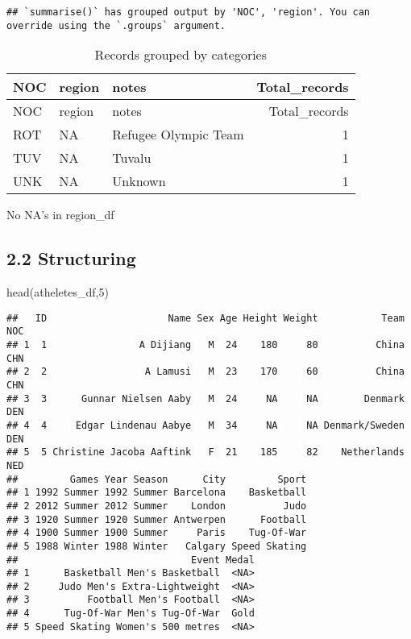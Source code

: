 \documentclass[
]{article}
\newenvironment{Shaded}{\begin{snugshade}}{\end{snugshade}}
\newcommand{\DecValTok}[1]{\textcolor[rgb]{0.00,0.00,0.81}{#1}}
\newcommand{\FunctionTok}[1]{\textcolor[rgb]{0.00,0.00,0.00}{#1}}
\newcommand{\NormalTok}[1]{#1}
\begin{document}
\begin{verbatim}
## `summarise()` has grouped output by 'NOC', 'region'. You can override using the `.groups` argument.
\end{verbatim}

\begin{longtable}[]{@{}lllr@{}}
\caption{Records grouped by categories}\tabularnewline
\toprule
NOC & region & notes & Total\_records \\
\midrule
\endfirsthead
\toprule
NOC & region & notes & Total\_records \\
\midrule
\endhead
ROT & NA & Refugee Olympic Team & 1 \\
TUV & NA & Tuvalu & 1 \\
UNK & NA & Unknown & 1 \\
\bottomrule
\end{longtable}

No NA's in region\_df

\hypertarget{structuring}{%
\subsection{2.2 Structuring}\label{structuring}}

\begin{Shaded}
\begin{Highlighting}[]
\FunctionTok{head}\NormalTok{(atheletes\_df,}\DecValTok{5}\NormalTok{)}
\end{Highlighting}
\end{Shaded}

\begin{verbatim}
##   ID                     Name Sex Age Height Weight           Team NOC
## 1  1                A Dijiang   M  24    180     80          China CHN
## 2  2                 A Lamusi   M  23    170     60          China CHN
## 3  3      Gunnar Nielsen Aaby   M  24     NA     NA        Denmark DEN
## 4  4     Edgar Lindenau Aabye   M  34     NA     NA Denmark/Sweden DEN
## 5  5 Christine Jacoba Aaftink   F  21    185     82    Netherlands NED
##         Games Year Season      City         Sport
## 1 1992 Summer 1992 Summer Barcelona    Basketball
## 2 2012 Summer 2012 Summer    London          Judo
## 3 1920 Summer 1920 Summer Antwerpen      Football
## 4 1900 Summer 1900 Summer     Paris    Tug-Of-War
## 5 1988 Winter 1988 Winter   Calgary Speed Skating
##                              Event Medal
## 1      Basketball Men's Basketball  <NA>
## 2     Judo Men's Extra-Lightweight  <NA>
## 3          Football Men's Football  <NA>
## 4      Tug-Of-War Men's Tug-Of-War  Gold
## 5 Speed Skating Women's 500 metres  <NA>
\end{verbatim}
\end{document}
